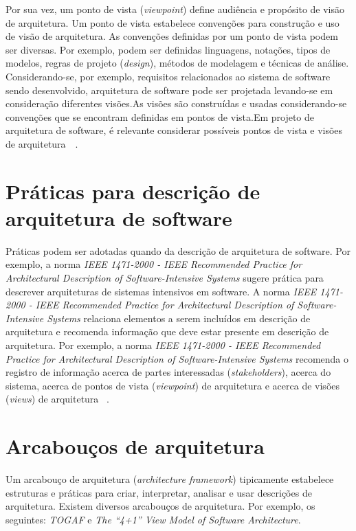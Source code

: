 Por sua vez, um ponto de vista (\emph{viewpoint}) define audiência e propósito de visão de arquitetura. Um ponto de vista estabelece convenções para construção e uso de visão de arquitetura. As convenções definidas por um ponto de vista podem ser diversas. Por exemplo, podem ser definidas linguagens, notações, tipos de modelos, regras de projeto (\emph{design}), métodos de modelagem e técnicas de análise. Considerando-se, por exemplo, requisitos relacionados ao sistema de software sendo desenvolvido, arquitetura de software pode ser projetada levando-se em consideração diferentes visões.As visões são construídas e usadas considerando-se convenções que se encontram definidas em pontos de vista.Em projeto de arquitetura de software, é relevante considerar possíveis pontos de vista e visões de arquitetura~\cite{ISO_1471}~\cite{ISO_42010}. 



\section{Práticas para descrição de arquitetura de software}


Práticas podem ser adotadas quando da descrição de arquitetura de software. Por exemplo, a norma  \emph{IEEE 1471-2000 - IEEE Recommended Practice for Architectural Description of Software-Intensive Systems} sugere prática para descrever arquiteturas de sistemas intensivos em software. A norma \emph{IEEE 1471-2000 - IEEE Recommended Practice for Architectural Description of Software-Intensive Systems} relaciona elementos a serem incluídos em descrição de arquitetura e recomenda informação que deve estar presente em descrição de arquitetura. Por exemplo, a norma \emph{IEEE 1471-2000 - IEEE Recommended Practice for Architectural Description of Software-Intensive Systems} recomenda o registro de informação acerca de partes interessadas (\emph{stakeholders}), acerca do sistema, acerca de pontos de vista (\emph{viewpoint}) de arquitetura e acerca de visões (\emph{views}) de arquitetura ~\cite{ISO_1471}.

\section{Arcabouços de arquitetura}

Um arcabouço de arquitetura (\emph{architecture framework}) tipicamente estabelece estruturas e práticas para criar, interpretar, analisar e usar descrições de arquitetura. Existem diversos arcabouços de arquitetura. Por exemplo, os seguintes: \emph{\acrfull{TOGAF}} e \emph{The “4+1” View Model of Software Architecture}. 


